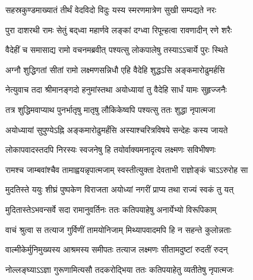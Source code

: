 
\translink{}

\storymeta


\twolineshloka
{सहस्रकुण्डमाख्यातं तीर्थं वेदविदो विदुः}
{यस्य स्मरणमात्रेण सुखी सम्पद्यते नरः} %

\twolineshloka
{पुरा दाशरथी रामः सेतुं बद्‌ध्वा महार्णवे}
{लङ्कां दग्ध्वा रिपून्हत्वा रावणादीन् रणे शरैः} %

\twolineshloka
{वैदेहीं च समासाद्य रामो वचनमब्रवीत्}
{पश्यत्सु लोकपालेषु तस्याऽऽचार्ये पुरः स्थिते} %

\twolineshloka
{अग्नौ शुद्धिगतां सीतां रामो लक्ष्मणसन्निधौ}
{एहि वैदेहि शुद्धऽसि अङ्कमारोढुमर्हसि} %

\twolineshloka
{नेत्युवाच तदा श्रीमानङ्गदो हनुमांस्तथा}
{अयोध्यायां तु वैदेहि सार्धं यामः सुहृज्जनैः} %

\twolineshloka
{तत्र शुद्धिमवाप्याथ पुनर्भातृषु मातृषु}
{लौकिकेष्वपि पश्यत्सु ततः शुद्धा नृपात्मजा} %

\twolineshloka
{अयोध्यायां सुपुण्येऽह्नि अङ्कमारोढुमर्हंसि}
{अस्याश्चरित्रविषये सन्देहः कस्य जायते} %

\twolineshloka
{लोकापवादस्तदपि निरस्यः स्वजनेषु हि}
{तयोर्वाक्यमनादृत्य लक्ष्मणः सविभीषणः} %

\twolineshloka
{रामश्च जाम्बवांश्चैव तामाह्वयन्नृपात्मजाम्}
{स्वस्तीत्युक्ता देवताभी राज्ञोङ्कं चाऽऽरुरोह सा} %

\twolineshloka
{मुदतिस्ते ययुः शीघ्रं पुष्पकेण विराजता}
{अयोध्यां नगरीं प्राप्य तथा राज्यं स्वकं तु यत्} %

\twolineshloka
{मुदितास्तेऽभवन्सर्वे सदा रामानुवर्तिनः}
{ततः कतिपयाहेषु अनार्येभ्यो विरूपिकाम्} %

\twolineshloka
{वाचं श्रुत्वा स तत्याज गुर्विणीं तामयोनिजाम्}
{मिथ्यापवादमपि हि न सहन्ते कुलोन्नताः} %

\twolineshloka
{वाल्मीकेर्मुनिमुख्यस्य आश्रमस्य समीपतः}
{तत्याज लक्ष्मणः सीतामदुष्टां रुदतीं रुदन्} %

\twolineshloka
{नोल्लङ्घ्याऽऽज्ञा गुरूणामित्यसौ तदकरोद्भिया}
{ततः कतिपयाहेतु व्यतीतेषु नृपात्मजः} %

